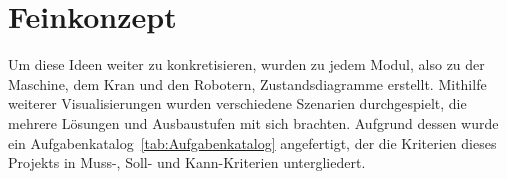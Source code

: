 \section{Feinkonzept}
Um diese Ideen weiter zu konkretisieren, wurden zu jedem Modul, also zu der Maschine, dem
Kran und den Robotern, Zustandsdiagramme erstellt. Mithilfe weiterer Visualisierungen wurden verschiedene Szenarien durchgespielt, die mehrere Lösungen und Ausbaustufen mit sich
brachten. Aufgrund dessen wurde ein Aufgabenkatalog~\ref{tab:Aufgabenkatalog} angefertigt, der die Kriterien dieses
Projekts in Muss-, Soll- und Kann-Kriterien untergliedert.